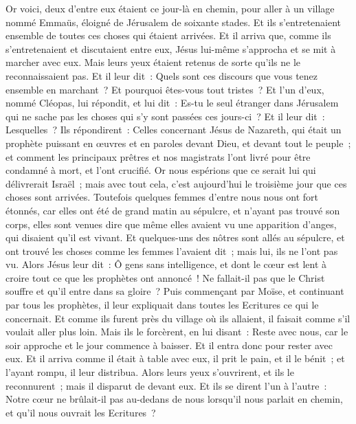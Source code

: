 \begin{multicols}{2}
Or voici, deux d'entre eux étaient ce jour-là en chemin, pour aller à un village nommé Emmaüs, éloigné de Jérusalem de soixante stades.
Et ils s'entretenaient ensemble de toutes ces choses qui étaient arrivées.
Et il arriva que, comme ils s'entretenaient et discutaient entre eux, Jésus lui-même s'approcha et se mit à marcher avec eux.
Mais leurs yeux étaient retenus de sorte qu'ils ne le reconnaissaient pas.
Et il leur dit~: Quels sont ces discours que vous tenez ensemble en marchant~? Et pourquoi êtes-vous tout tristes~?
Et l'un d'eux, nommé Cléopas, lui répondit, et lui dit~: Es-tu le seul étranger dans Jérusalem qui ne sache pas les choses qui s'y sont passées ces jours-ci~?
Et il leur dit~: Lesquelles~? Ils répondirent~: Celles concernant Jésus de Nazareth, qui était un prophète puissant en œuvres et en paroles devant Dieu, et devant tout le peuple~;
et comment les principaux prêtres et nos magistrats l'ont livré pour être condamné à mort, et l'ont crucifié.
Or nous espérions que ce serait lui qui délivrerait Israël~; mais avec tout cela, c'est aujourd'hui le troisième jour que ces choses sont arrivées.
Toutefois quelques femmes d'entre nous nous ont fort étonnés, car elles ont été de grand matin au sépulcre,
et n'ayant pas trouvé son corps, elles sont venues dire que même elles avaient vu une apparition d'anges, qui disaient qu'il est vivant.
Et quelques-uns des nôtres sont allés au sépulcre, et ont trouvé les choses comme les femmes l'avaient dit~; mais lui, ils ne l'ont pas vu.
Alors Jésus leur dit~: Ô gens sans intelligence, et dont le cœur est lent à croire tout ce que les prophètes ont annoncé~!
Ne fallait-il pas que le Christ souffre et qu'il entre dans sa gloire~?
Puis commençant par Moïse, et continuant par tous les prophètes, il leur expliquait dans toutes les Ecritures ce qui le concernait.
Et comme ils furent près du village où ils allaient, il faisait comme s'il voulait aller plus loin.
Mais ils le forcèrent, en lui disant~: Reste avec nous, car le soir approche et le jour commence à baisser. Et il entra donc pour rester avec eux.
Et il arriva comme il était à table avec eux, il prit le pain, et il le bénit~; et l'ayant rompu, il leur distribua.
Alors leurs yeux s'ouvrirent, et ils le reconnurent~; mais il disparut de devant eux.
Et ils se dirent l'un à l'autre~: Notre cœur ne brûlait-il pas au-dedans de nous lorsqu'il nous parlait en chemin, et qu'il nous ouvrait les Ecritures~?

\end{multicols}
